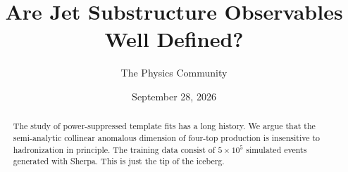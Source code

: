 \documentclass[11pt]{article}
\title{Are Jet Substructure Observables Well Defined?}
\author{The Physics Community}
\date{September 28, 2026}
\numberwithin{equation}{section}
\theoremstyle{definition}
\theoremstyle{remark}
\begin{document}
\maketitle
\begin{abstract}
The study of power-suppressed template fits has a long history. We argue
that the semi-analytic collinear anomalous dimension of four-top
production is insensitive to hadronization in principle. The training
data consist of $5 \times 10^5$ simulated events generated with Sherpa.
This is just the tip of the iceberg.
\end{abstract}
\tableofcontents






\nocite{*}


\end{document}
